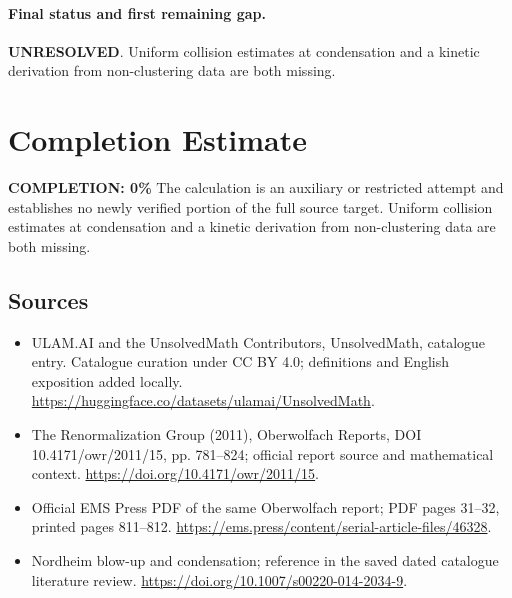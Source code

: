 \documentclass[11pt]{article}
\begin{document}
\paragraph{Final status and first remaining gap.}
\textbf{UNRESOLVED}. Uniform collision estimates at condensation and a kinetic derivation from non-clustering data are both missing.

\section{Completion Estimate}
\noindent\textbf{COMPLETION: 0\%}
The calculation is an auxiliary or restricted attempt and establishes no newly verified portion of the full source target. Uniform collision estimates at condensation and a kinetic derivation from non-clustering data are both missing.

\subsection{Sources}
\begin{itemize}
\item[\hypertarget{source:statement:1}{S1}] ULAM.AI and the UnsolvedMath Contributors, UnsolvedMath, catalogue entry. Catalogue curation under CC BY 4.0; definitions and English exposition added locally.
\url{https://huggingface.co/datasets/ulamai/UnsolvedMath}.
\item[\hypertarget{source:statement:2}{S2}] The Renormalization Group (2011), Oberwolfach Reports, DOI 10.4171/owr/2011/15, pp. 781--824; official report source and mathematical context.
\url{https://doi.org/10.4171/owr/2011/15}.
\item[\hypertarget{source:statement:3}{S3}] Official EMS Press PDF of the same Oberwolfach report; PDF pages 31--32, printed pages 811--812.
\url{https://ems.press/content/serial-article-files/46328}.
\item[\hypertarget{source:statement:4}{S4}] Nordheim blow-up and condensation; reference in the saved dated catalogue literature review.
\url{https://doi.org/10.1007/s00220-014-2034-9}.
\end{itemize}
\label{end:statement}
\end{document}

